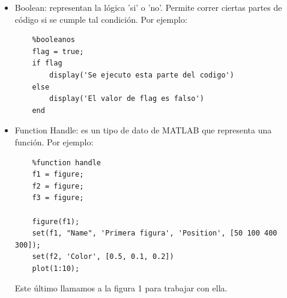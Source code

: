 \begin{itemize}
    \item Boolean: representan la lógica 'si' o 'no'. Permite correr ciertas partes de código si se cumple tal condición. Por ejemplo:
    
    \begin{lstlisting}
    %booleanos
    flag = true;
    if flag
        display('Se ejecuto esta parte del codigo')
    else
        display('El valor de flag es falso') 
    end
    \end{lstlisting}

    \item Function Handle: es un tipo de dato de MATLAB que representa una función. Por ejemplo:
    
    \begin{lstlisting}
    %function handle
    f1 = figure;
    f2 = figure;
    f3 = figure;

    figure(f1);
    set(f1, "Name", 'Primera figura', 'Position', [50 100 400 300]);
    set(f2, 'Color', [0.5, 0.1, 0.2])
    plot(1:10);
    \end{lstlisting}

    Este último llamamos a la figura 1 para trabajar con ella.
\end{itemize}